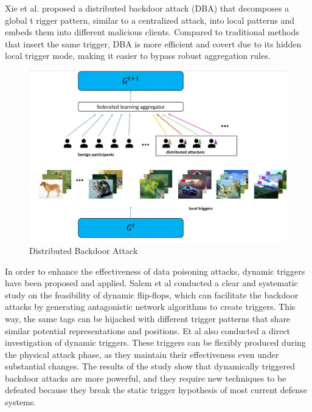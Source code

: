 \documentclass[conference]{IEEEtran}
\begin{document}
Xie et al. \cite{b59} proposed a distributed backdoor attack (DBA) that decomposes a global t
rigger pattern, similar to a centralized attack, into local patterns and embeds
them into different malicious clients. Compared to traditional methods that insert
the same trigger, DBA is more efficient and covert due to its hidden local
trigger mode, making it easier to bypass robust aggregation rules.

\begin{figure}[htbp]
    \centerline{\includegraphics[width=0.8\linewidth,height=0.4\linewidth]{picture/f8.jpg}}
    \caption{Distributed Backdoor Attack}
    \label{fig8}
\end{figure}

In order to enhance the effectiveness of data poisoning attacks,
dynamic triggers have been proposed and applied. Salem et al \cite{b60} conducted a
clear and systematic study on the feasibility of dynamic flip-flops,
which can facilitate the backdoor attacks by generating antagonistic
network algorithms to create triggers. This way, the same tags can be
hijacked with different trigger patterns that share similar potential
representations and positions. Et al \cite{b61} also conducted a direct
investigation of dynamic triggers. These triggers can be flexibly produced
during the physical attack phase, as they maintain their effectiveness even
under substantial changes. The results of the study show that dynamically
triggered backdoor attacks are more powerful, and they require new techniques
to be defeated because they break the static trigger hypothesis of most current
defense systems.
\end{document}
